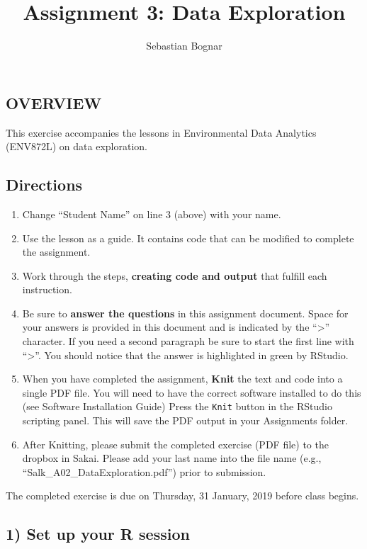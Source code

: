 \documentclass[]{article}
\title{Assignment 3: Data Exploration}
\author{Sebastian Bognar}
\date{}
\providecommand{\tightlist}{%
  \setlength{\itemsep}{0pt}\setlength{\parskip}{0pt}}
\begin{document}
\maketitle

\subsection{OVERVIEW}\label{overview}

This exercise accompanies the lessons in Environmental Data Analytics
(ENV872L) on data exploration.

\subsection{Directions}\label{directions}

\begin{enumerate}
\def\labelenumi{\arabic{enumi}.}
\tightlist
\item
  Change ``Student Name'' on line 3 (above) with your name.
\item
  Use the lesson as a guide. It contains code that can be modified to
  complete the assignment.
\item
  Work through the steps, \textbf{creating code and output} that fulfill
  each instruction.
\item
  Be sure to \textbf{answer the questions} in this assignment document.
  Space for your answers is provided in this document and is indicated
  by the ``\textgreater{}'' character. If you need a second paragraph be
  sure to start the first line with ``\textgreater{}''. You should
  notice that the answer is highlighted in green by RStudio.
\item
  When you have completed the assignment, \textbf{Knit} the text and
  code into a single PDF file. You will need to have the correct
  software installed to do this (see Software Installation Guide) Press
  the \texttt{Knit} button in the RStudio scripting panel. This will
  save the PDF output in your Assignments folder.
\item
  After Knitting, please submit the completed exercise (PDF file) to the
  dropbox in Sakai. Please add your last name into the file name (e.g.,
  ``Salk\_A02\_DataExploration.pdf'') prior to submission.
\end{enumerate}

The completed exercise is due on Thursday, 31 January, 2019 before class
begins.

\subsection{1) Set up your R session}\label{set-up-your-r-session}
\end{document}
